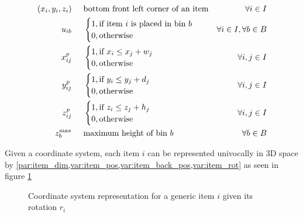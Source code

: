 \begin{align}
              (x_i,y_i,z_i) \hspace{.5cm}& \text{bottom front left corner of an item} & \forall i \in I \label{var:item_pos} \\
                    u_{ib} \hspace{.5cm}& \begin{cases}
                                            1, \text{if item $i$ is placed in bin $b$} \\ 
                                            0, \text{otherwise}
                                        \end{cases} & \forall i \in I, \forall b \in B \notag \\
                    x^p_{ij} \hspace{.5cm}& \begin{cases}
                                            1, \text{if $x_i \le x_j + w_j$} \\ 
                                            0, \text{otherwise}
                                        \end{cases} & \forall i,j \in I \notag \\
                    y^p_{ij} \hspace{.5cm}& \begin{cases}
                                            1, \text{if $y_i \le y_j + d_j$} \\ 
                                            0, \text{otherwise}
                                        \end{cases} & \forall i,j \in I \notag \\
                    z^p_{ij} \hspace{.5cm}& \begin{cases}
                                            1, \text{if $z_i \le z_j + h_j$} \\ 
                                            0, \text{otherwise}
                                        \end{cases} & \forall i,j \in I \notag \\
            z_b^\text{max} \hspace{.5cm}& \text{maximum height of bin $b$} & \forall b \in B \notag
\end{align}

Given a coordinate system, each item $i$ can be represented univocally in 3D space by \cref{par:item_dim,var:item_pos,var:item_back_pos,var:item_rot} as seen in figure \ref{fig:coordinate_system}
\begin{figure}
    \scalebox{0.65}{%
    
    }
    \caption{Coordinate system representation for a generic item $i$ given its rotation $r_i$ 
    \label{fig:coordinate_system}}
\end{figure}

